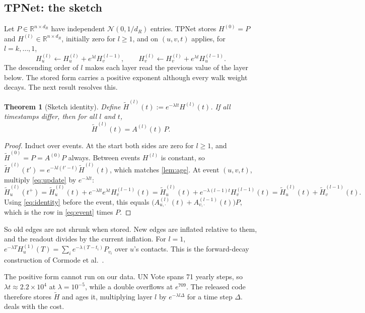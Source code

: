 \documentclass[11pt,a4paper]{article}
\theoremstyle{plain}
\newtheorem{theorem}{Theorem}
\theoremstyle{definition}
\newcommand{\R}{\mathbb{R}}
\newcommand{\tH}{\widetilde{H}}
\begin{document}
\subsection{TPNet: the sketch}\label{sec:sketch}
Let $P\in\R^{n\times d_R}$ have independent $\mathcal{N}(0,1/d_R)$ entries. TPNet stores $H^{(0)}=P$ and $H^{(l)}\in\R^{n\times d_R}$, initially zero for $l\ge1$, and on $(u,v,t)$ applies, for $l=k,\dots,1$,
\begin{equation}\label{eq:update}
H_u^{(l)}\leftarrow H_u^{(l)}+e^{\lambda t}H_v^{(l-1)},\qquad H_v^{(l)}\leftarrow H_v^{(l)}+e^{\lambda t}H_u^{(l-1)}.
\end{equation}
The descending order of $l$ makes each layer read the previous value of the layer below. The stored form carries a positive exponent although every walk weight decays. The next result resolves this.
\begin{theorem}[Sketch identity]\label{thm:sketch}
Define $\tH^{(l)}(t):=e^{-\lambda l t}H^{(l)}(t)$. If all timestamps differ, then for all $l$ and $t$,
\begin{equation}\label{eq:identity}
\tH^{(l)}(t)=A^{(l)}(t)\,P .
\end{equation}
\end{theorem}
\begin{proof}
Induct over events. At the start both sides are zero for $l\ge1$, and $\tH^{(0)}=P=A^{(0)}P$ always. Between events $H^{(l)}$ is constant, so $\tH^{(l)}(t')=e^{-\lambda l(t'-t)}\tH^{(l)}(t)$, which matches \cref{lem:age}. At event $(u,v,t)$, multiply \eqref{eq:update} by $e^{-\lambda lt}$:
\[
\tH_u^{(l)}(t^{+})=\tH_u^{(l)}(t)+e^{-\lambda lt}e^{\lambda t}H_v^{(l-1)}(t)=\tH_u^{(l)}(t)+e^{-\lambda(l-1)t}H_v^{(l-1)}(t)=\tH_u^{(l)}(t)+\tH_v^{(l-1)}(t).
\]
Using \eqref{eq:identity} before the event, this equals $\bigl(A^{(l)}_{u,\cdot}(t)+A^{(l-1)}_{v,\cdot}(t)\bigr)P$, which is the row in \eqref{eq:event} times $P$.
\end{proof}
So old edges are not shrunk when stored. New edges are inflated relative to them, and the readout divides by the current inflation. For $l=1$, $e^{-\lambda T}H_u^{(1)}(T)=\sum_i e^{-\lambda(T-t_i)}P_{v_i}$ over $u$'s contacts. This is the forward-decay construction of Cormode et al.\ \cite{forward}.

The positive form cannot run on our data. UN Vote spans 71 yearly steps, so $\lambda t\approx 2.2\times10^{4}$ at $\lambda=10^{-5}$, while a double overflows at $e^{709}$. The released code therefore stores $\tH$ and ages it, multiplying layer $l$ by $e^{-\lambda l\Delta}$ for a time step $\Delta$.  deals with the cost.
\end{document}
